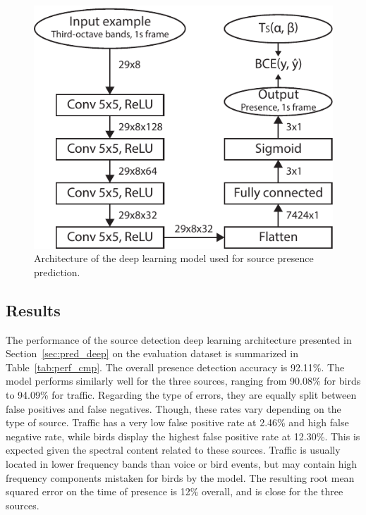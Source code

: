 \documentclass[twocolumn]{article}
\begin{document}
\begin{figure}[h!]
    \centering
    \includegraphics[width=\columnwidth]{figures/deep_arch.pdf}
    \caption{Architecture of the deep learning model used for source presence prediction.}\label{fig:deep_arch}
\end{figure}

\subsection{Results}
\label{sec:pred_res}

The performance of the source detection deep learning architecture presented in Section~\ref{sec:pred_deep} on the evaluation dataset is summarized in Table~\ref{tab:perf_cmp}. The overall presence detection accuracy is 92.11\%. The model performs similarly well for the three sources, ranging from 90.08\% for birds to 94.09\% for traffic. Regarding the type of errors, they are equally split between false positives and false negatives. Though, these rates vary depending on the type of source. Traffic has a very low false positive rate at 2.46\% and high false negative rate, while birds display the highest false positive rate at 12.30\%. This is expected given the spectral content related to these sources. Traffic is usually located in lower frequency bands than voice or bird events, but may contain high frequency components mistaken for birds by the model. The resulting root mean squared error on the time of presence is 12\% overall, and is close for the three sources.
\end{document}
